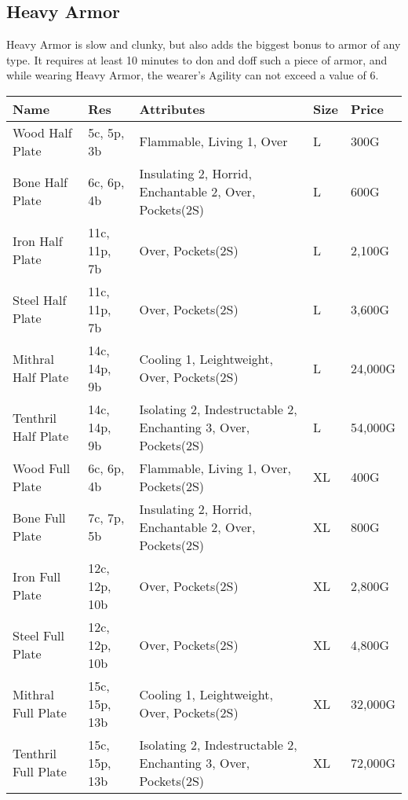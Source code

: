 \subsection{Heavy Armor}\label{subsec:heavyArmor}
Heavy Armor is slow and clunky, but also adds the biggest bonus to armor of any type.
It requires at least 10 minutes to don and doff such a piece of armor, and while wearing Heavy Armor, the wearer's Agility can not exceed a value of 6.
\begin{longtable}{p{3cm} | p{1.5cm} | p{5cm} | p{1cm} | p{1.5cm}}
	Name & Res &  Attributes & Size & Price\\ \hline
	Wood Half Plate  & 5c, 5p, 3b & Flammable, Living 1, Over & L & 300G\\
	
	Bone Half Plate  & 6c, 6p, 4b & Insulating 2, Horrid, Enchantable 2, Over, Pockets(2S) & L & 600G\\
	
	Iron Half Plate  & 11c, 11p, 7b & Over, Pockets(2S) & L & 2,100G\\
	
	Steel Half Plate  & 11c, 11p, 7b & Over, Pockets(2S) & L & 3,600G\\
	
	Mithral Half Plate  & 14c, 14p, 9b & Cooling 1, Leightweight, Over, Pockets(2S) & L & 24,000G\\
	
	Tenthril Half Plate  & 14c, 14p, 9b & Isolating 2, Indestructable 2, Enchanting 3, Over, Pockets(2S) & L & 54,000G\\
	
	Wood Full Plate  & 6c, 6p, 4b & Flammable, Living 1, Over, Pockets(2S) & XL & 400G\\
	
	Bone Full Plate  & 7c, 7p, 5b & Insulating 2, Horrid, Enchantable 2, Over, Pockets(2S) & XL & 800G\\
	
	Iron Full Plate  & 12c, 12p, 10b & Over, Pockets(2S) & XL & 2,800G\\
	
	Steel Full Plate  & 12c, 12p, 10b & Over, Pockets(2S) & XL & 4,800G\\
	
	Mithral Full Plate  & 15c, 15p, 13b & Cooling 1, Leightweight, Over, Pockets(2S) & XL & 32,000G\\
	
	Tenthril Full Plate  & 15c, 15p, 13b & Isolating 2, Indestructable 2, Enchanting 3, Over, Pockets(2S) & XL & 72,000G\\
\end{longtable}